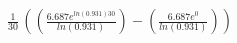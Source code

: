 \documentclass[preview]{standalone}
\begin{document}
\begin{align*}
\frac{1}{30}\,((\frac{6.687e^{ln(0.931)30}}{ln(0.931)})-(\frac{6.687e^{0}}{ln(0.931)}))
\end{align*}
\end{document}
